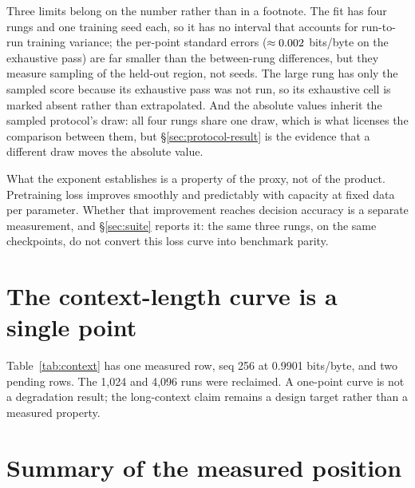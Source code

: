 Three limits belong on the number rather than in a footnote. The fit has four
rungs and one training seed each, so it has no interval that accounts for
run-to-run training variance; the per-point standard errors
($\approx 0.002$ bits/byte on the exhaustive pass) are far smaller than the
between-rung differences, but they measure sampling of the held-out region, not
seeds. The large rung has only the sampled score because its exhaustive pass
was not run, so its exhaustive cell is marked absent rather than extrapolated.
And the absolute values inherit the sampled protocol's draw: all four rungs
share one draw, which is what licenses the comparison between them, but
\S\ref{sec:protocol-result} is the evidence that a different draw moves the
absolute value.

What the exponent establishes is a property of the proxy, not of the product.
Pretraining loss improves smoothly and predictably with capacity at fixed data
per parameter. Whether that improvement reaches decision accuracy is a separate
measurement, and \S\ref{sec:suite} reports it: the same three rungs, on the same
checkpoints, do not convert this loss curve into benchmark parity.




\section{The context-length curve is a single point}
\label{sec:context}

Table~\ref{tab:context} has one measured row, seq 256 at 0.9901 bits/byte, and two
pending rows. The 1,024 and 4,096 runs were reclaimed. A one-point curve is not a
degradation result; the long-context claim remains a design target rather than a
measured property.





\section{Summary of the measured position}

